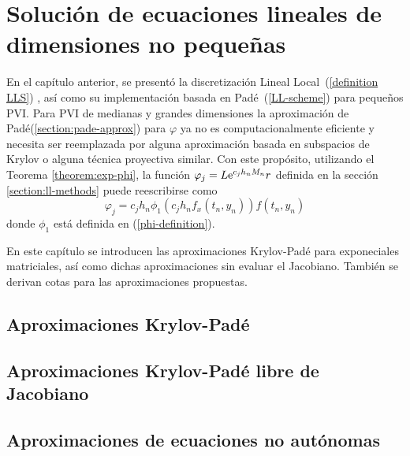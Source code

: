 \chapter{Solución de ecuaciones lineales de dimensiones no pequeñas}\label{chapter:solve-non-smal-lineal-eq}

En el capítulo anterior, se presentó la discretización Lineal Local~(\ref{definition LLS}) , así como su implementación basada en Padé~(\ref{LL-scheme}) para pequeños PVI. Para PVI de medianas y grandes dimensiones la aproximación de Padé(\ref{section:pade-approx}) para $\varphi$ ya no es computacionalmente eficiente y necesita ser reemplazada por alguna aproximación basada en subspacios de Krylov o alguna técnica proyectiva similar. Con este propósito, utilizando el Teorema \ref{theorem:exp-phi}, la función $\varphi_j=L\mathrm{e}^{c_jh_nM_n}r$ definida en la sección \ref{section:ll-methods} puede reescribirse como
\begin{equation*}
    \varphi_j=c_jh_n\phi_1(c_jh_nf_x(t_n,y_n))f(t_n,y_n)
\end{equation*}
donde $\phi_1$ está definida en (\ref{phi-definition}).

En este capítulo se introducen las aproximaciones Krylov-Padé para exponeciales matriciales, así como dichas aproximaciones sin evaluar el Jacobiano. También se derivan cotas para las aproximaciones propuestas.

\section{Aproximaciones Krylov-Padé}




\section{Aproximaciones Krylov-Padé libre de Jacobiano}


\section{Aproximaciones de ecuaciones no autónomas}
